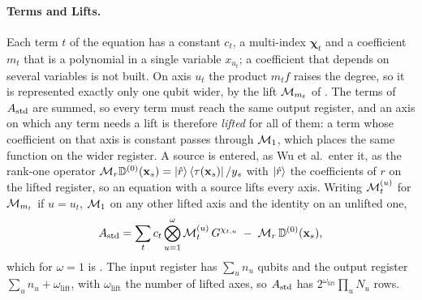 \paragraph{Terms and Lifts.} Each term $t$ of the equation has a constant $c_t$, a multi-index $\boldsymbol\chi_t$ and a coefficient $m_t$ that is a polynomial in a single variable $x_{u_t}$; a coefficient that depends on several variables is not built. On axis $u_t$ the product $m_tf$ raises the degree, so it is represented exactly only one qubit wider, by the lift $\mathcal{M}_{m_t}$ of . The terms of $A_{\mathrm{std}}$ are summed, so every term must reach the same output register, and an axis on which any term needs a lift is therefore \emph{lifted} for all of them: a term whose coefficient on that axis is constant passes through $\mathcal{M}_1$, which places the same function on the wider register. A source is entered, as Wu et al.\ enter it, as the rank-one operator $\mathcal{M}_r\mathbb{D}^{(0)}(\mathbf x_s)=\ket{\hat r}\bra{\tau(\mathbf x_s)}/y_s$ with $\ket{\hat r}$ the coefficients of $r$ on the lifted register, so an equation with a source lifts every axis. Writing $\mathcal{M}^{(u)}_t$ for $\mathcal{M}_{m_t}$ if $u=u_t$, $\mathcal{M}_1$ on any other lifted axis and the identity on an unlifted one,
\begin{equation}
    A_{\mathrm{std}} = \sum_t c_t\bigotimes_{u=1}^{\omega}\mathcal{M}^{(u)}_t\,G^{\chi_{t,u}} \;-\; \mathcal{M}_r\,\mathbb{D}^{(0)}(\mathbf x_s),
    \label{eq:app-A-multi}
\end{equation}
which for $\omega=1$ is . The input register has $\sum_un_u$ qubits and the output register $\sum_un_u+\omega_{\mathrm{lift}}$, with $\omega_{\mathrm{lift}}$ the number of lifted axes, so $A_{\mathrm{std}}$ has $2^{\omega_{\mathrm{lift}}}\prod_uN_u$ rows.

